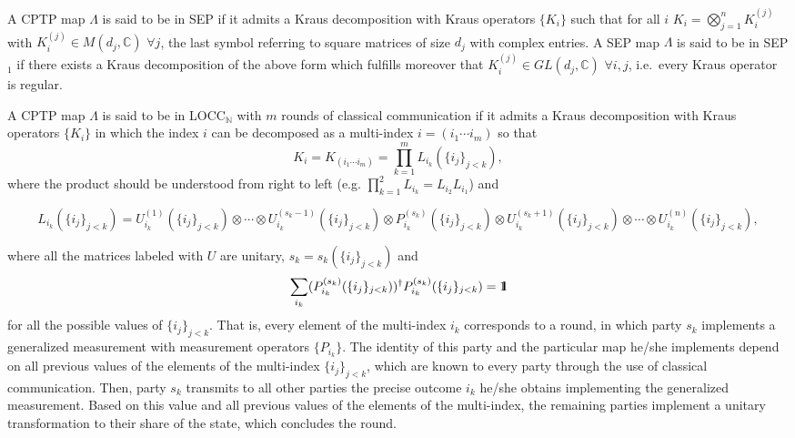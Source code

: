 \documentclass[superscriptaddress,twocolumn]{revtex4}\usepackage[utf8]{inputenc}
\newcommand{\one}{\mbox{$1 \hspace{-1.0mm}  {\bf l}$}}
\begin{document}
A CPTP map $\Lambda$ is said to be in SEP if it admits a Kraus decomposition with Kraus operators $\{K_i\}$ such that for all $i$ $K_i=\bigotimes_{j=1}^nK_i^{(j)}$ with $K_i^{(j)}\in M(d_j, \mathbb{C})$ $\forall j$, the last symbol referring to square matrices of size $d_j$ with complex entries. A SEP map $\Lambda$ is said to be in SEP$_1$ if there exists a Kraus decomposition of the above form which fulfills moreover that $K_i^{(j)}\in GL(d_j, \mathbb{C})$ $\forall i,j$, i.e.\ every Kraus operator is regular.

A CPTP map $\Lambda$ is said to be in LOCC$_\mathbb{N}$ with $m$ rounds of classical communication if it admits a Kraus decomposition with Kraus operators $\{K_i\}$ in which the index $i$ can be decomposed as a multi-index $i=(i_1\cdots i_m)$ so that
\begin{equation}
K_i=K_{(i_1\cdots i_m)}=\prod_{k=1}^m L_{i_k}(\{i_j\}_{j<k}),
\end{equation}
where the product should be understood from right to left (e.g. $\prod_{k=1}^2L_{i_k}=L_{i_2}L_{i_1}$) and
\begin{widetext}
\begin{equation}
L_{i_k}(\{i_j\}_{j<k})=U_{i_k}^{(1)}(\{i_j\}_{j<k})\otimes\cdots\otimes U_{i_k}^{(s_k-1)}(\{i_j\}_{j<k})\otimes P_{i_k}^{(s_k)}(\{i_j\}_{j<k})\otimes U_{i_k}^{(s_k+1)}(\{i_j\}_{j<k})\otimes\cdots\otimes U_{i_k}^{(n)}(\{i_j\}_{j<k}),\label{lio}
\end{equation}
\end{widetext}
where all the matrices labeled with $U$ are unitary, $s_k=s_k(\{i_j\}_{j<k})$ and
\begin{equation}
\sum_{i_k}(P_{i_k}^{(s_k)}(\{i_j\}_{j< k}))^\dag P_{i_k}^{(s_k)}(\{i_j\}_{j< k})=\one
\end{equation}
for all the possible values of $\{i_j\}_{j< k}$. That is, every element of the multi-index $i_k$ corresponds to a round, in which party $s_k$ implements a generalized measurement with measurement operators $\{P_{i_k}\}$. The identity of this party and the particular map he/she implements depend on all previous values of the elements of the multi-index $\{i_j\}_{j<k}$, which are known to every party through the use of classical communication. Then, party $s_k$ transmits to all other parties the precise outcome $i_k$ he/she obtains implementing the generalized measurement. Based on this value and all previous values of the elements of the multi-index, the remaining parties implement a unitary transformation to their share of the state, which concludes the round.
\end{document}
